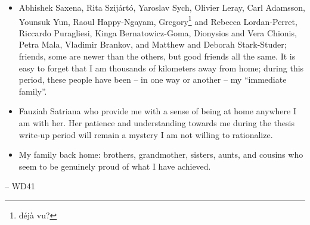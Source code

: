 \begin{itemize}
	\item Abhishek Saxena, Rita Szijártó, Yaroslav Sych, Olivier Leray, Carl Adamsson, Younsuk Yun, Raoul Happy-Ngayam, Gregory\footnote{déjà vu?} and Rebecca Lordan-Perret, Riccardo Puragliesi, Kinga Bernatowicz-Goma, Dionysios and Vera Chionis, Petra Mala, Vladimir Brankov, and Matthew and Deborah Stark-Studer; friends, some are newer than the others, but good friends all the same.
  It is easy to forget that I am thousands of kilometers away from home; during this period, these people have been -- in one way or another -- my ``immediate family''.
  \item Fauziah Satriana who provide me with a sense of being at home anywhere I am with her. Her patience and understanding towards me during the thesis write-up period will remain a mystery I am not willing to rationalize.
  \item My family back home: brothers, grandmother, sisters, aunts, and cousins who seem to be genuinely proud of what I have achieved.
\end{itemize}

\bigskip
\hspace*{0mm}-- WD41
